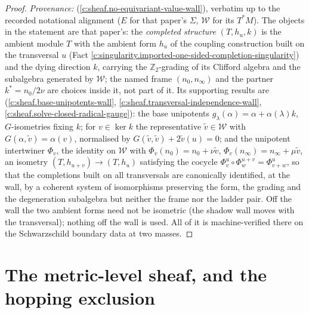 \documentclass[11pt]{article}
\theoremstyle{definition}
\theoremstyle{plain}
\providecommand{\nInf}{}\renewcommand{\nInf}{n_\infty}
\providecommand{\nO}{}\renewcommand{\nO}{n_0}
\providecommand{\shW}{}\renewcommand{\shW}{\mathcal{W}}
\begin{document}
\begin{proof}
\emph{Provenance:} \cite[Thm.~10.4]{ButlerT4} (\ref{c:sheaf.no-equivariant-value-wall}), verbatim up to the recorded notational alignment ($E$ for that paper's $\Sigma$, $\shW$ for its $T^*M$). The objects in the statement are that paper's: the \emph{completed structure} $(T, h_u, k)$ is the ambient module $T$ with the ambient form $h_u$ of the coupling construction built on the transversal $u$ (Fact \ref{c:singularity.imported-one-sided-completion-singularity}) and the dying direction $k$, carrying the $\mathbb{Z}_2$-grading of its Clifford algebra and the subalgebra generated by $\shW$; the named frame $(\nO, \nInf)$ and the partner $k^* = \nO/2\nu$ are choices inside it, not part of it. Its supporting results are \cite[Lems 10.1, 10.2, Thm.~10.3]{ButlerT4} (\ref{c:sheaf.base-unipotents-wall}, \ref{c:sheaf.transversal-independence-wall}, \ref{c:sheaf.solve-closed-radical-gauge}): the base unipotents $g_\lambda(\alpha) = \alpha + \alpha(\lambda)k$, $G$-isometries fixing $k$; for $v \in \ker k$ the representative $\tilde v \in \shW$ with $G(\alpha, \tilde v) = \alpha(v)$, normalised by $G(\tilde v, \tilde v) + 2\tilde v(u) = 0$; and the unipotent intertwiner $\Phi_v$, the identity on $\shW$ with $\Phi_v(\nO) = \nO + \nu\tilde v$, $\Phi_v(\nInf) = \nInf + \mu\tilde v$, an isometry $(T, h_{u+v}) \to (T, h_u)$ satisfying the cocycle $\Phi^u_v \circ \Phi^{u+v}_w = \Phi^u_{v+w}$, so that the completions built on all transversals are canonically identified, at the wall, by a coherent system of isomorphisms preserving the form, the grading and the degeneration subalgebra but neither the frame nor the ladder pair. Off the wall the two ambient forms need not be isometric (the shadow wall moves with the transversal); nothing off the wall is used. All of it is machine-verified there on the Schwarzschild boundary data at two masses.

\end{proof}

\section{The metric-level sheaf, and the hopping exclusion}
\end{document}
